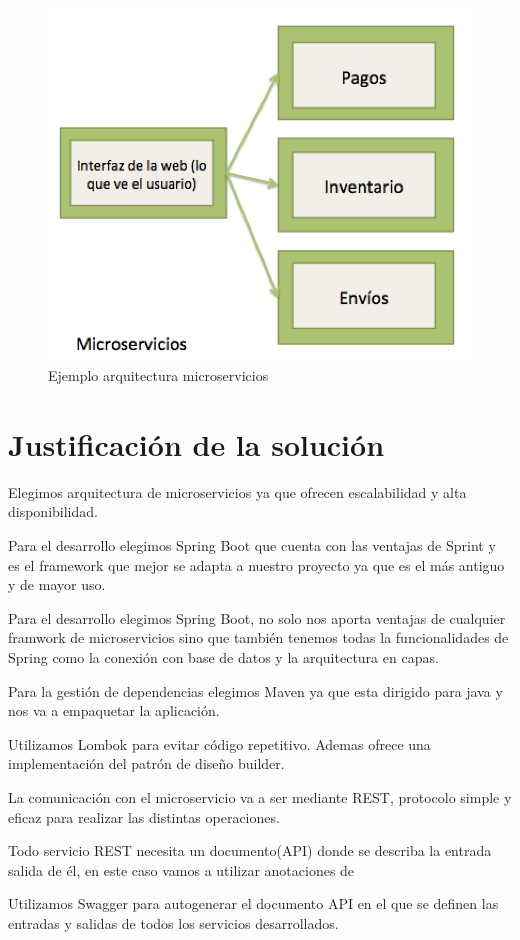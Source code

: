 \documentclass[12pt]{report} %
\begin{document}
\begin{figure}
	\centering
	\includegraphics[width=0.7\linewidth]{imagenes/microservices}
	\caption{Ejemplo arquitectura microservicios}
	\label{fig:microservicesGrafic}
\end{figure}


\chapter{Justificación de la solución}


Elegimos arquitectura de microservicios ya que ofrecen escalabilidad y alta disponibilidad.

Para el desarrollo elegimos Spring Boot que cuenta con las ventajas de Sprint y es el framework que mejor se adapta a nuestro proyecto ya que es el más antiguo y de mayor uso.

Para el desarrollo elegimos Spring Boot, no solo nos aporta ventajas de cualquier framwork de microservicios sino que también tenemos todas la funcionalidades de Spring como la conexión con base de datos y la arquitectura en capas.

Para la gestión de dependencias elegimos Maven ya que esta dirigido para java y nos va a empaquetar la aplicación.

Utilizamos Lombok para evitar código repetitivo. Ademas ofrece una implementación del patrón de diseño builder.

La comunicación con el microservicio va a ser mediante REST, protocolo simple y eficaz para realizar las distintas operaciones.

Todo servicio REST necesita un documento(API) donde se describa la entrada salida de él, en este caso vamos a utilizar anotaciones de 

Utilizamos Swagger para autogenerar el documento API en el que se definen las entradas y salidas de todos los servicios desarrollados.
\end{document}
